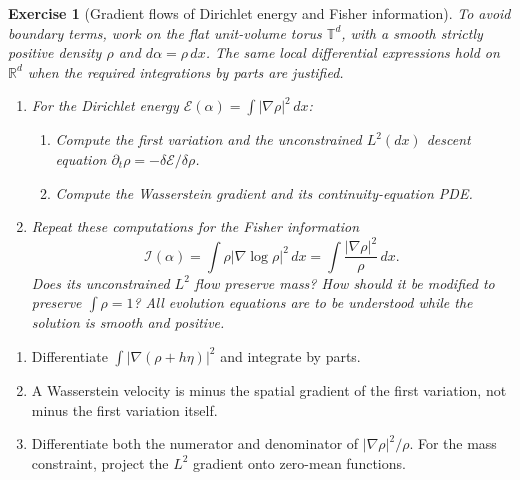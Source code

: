 \documentclass[11pt,a4paper]{article}
\theoremstyle{exostyle}
\newtheorem{exercise}{Exercise}
\newcommand{\R}{\mathbb{R}}
\begin{document}
\begin{exercise}[Gradient flows of Dirichlet energy and Fisher information]\label{ex:dirichlet-fisher}
To avoid boundary terms, work on the flat unit-volume torus $\mathbb T^d$, with a smooth strictly positive density $\rho$ and $d\alpha=\rho\,dx$. The same local differential expressions hold on $\R^d$ when the required integrations by parts are justified.
\begin{enumerate}[label=\textbf{(\arabic*)}]
\item For the Dirichlet energy $\mathcal E(\alpha)=\int|\nabla\rho|^2\,dx$:
\begin{enumerate}[label=(\alph*)]
\item Compute the first variation and the unconstrained $L^2(dx)$ descent equation $\partial_t\rho=-\delta\mathcal E/\delta\rho$.
\item Compute the Wasserstein gradient and its continuity-equation PDE.
\end{enumerate}
\item Repeat these computations for the Fisher information
\[
\mathcal I(\alpha)=\int\rho|\nabla\log\rho|^2\,dx=\int\frac{|\nabla\rho|^2}{\rho}\,dx.
\]
Does its unconstrained $L^2$ flow preserve mass? How should it be modified to preserve $\int\rho=1$? All evolution equations are to be understood while the solution is smooth and positive.
\end{enumerate}
\end{exercise}
\begin{hints}
\begin{enumerate}[label=(\arabic*)]
\item[(1a)] Differentiate $\int|\nabla(\rho+h\eta)|^2$ and integrate by parts.
\item[(1b)] A Wasserstein velocity is minus the spatial gradient of the first variation, not minus the first variation itself.
\item[(2)] Differentiate both the numerator and denominator of $|\nabla\rho|^2/\rho$. For the mass constraint, project the $L^2$ gradient onto zero-mean functions.
\end{enumerate}
\end{hints}
\end{document}
